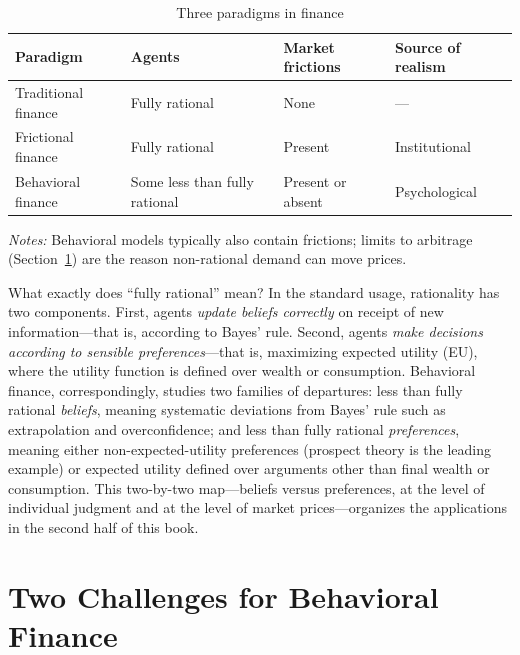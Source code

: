 \begin{table}[htbp]
\centering
\begin{threeparttable}
\caption{Three paradigms in finance}
\label{tab:paradigms}
\begin{tabular}{llll}
\toprule
Paradigm & Agents & Market frictions & Source of realism \\
\midrule
Traditional finance & Fully rational & None & --- \\
Frictional finance & Fully rational & Present & Institutional \\
Behavioral finance & Some less than fully rational & Present or absent & Psychological \\
\bottomrule
\end{tabular}
\begin{tablenotes}[flushleft]\small
\item \textit{Notes:} Behavioral models typically also contain frictions; limits to arbitrage (Section~\ref{sec:challenges}) are the reason non-rational demand can move prices.
\end{tablenotes}
\end{threeparttable}
\end{table}

What exactly does ``fully rational'' mean? In the standard usage, rationality has two components. First, agents \emph{update beliefs correctly} on receipt of new information---that is, according to Bayes' rule. Second, agents \emph{make decisions according to sensible preferences}---that is, maximizing expected utility (EU), where the utility function is defined over wealth or consumption. Behavioral finance, correspondingly, studies two families of departures: less than fully rational \emph{beliefs}, meaning systematic deviations from Bayes' rule such as extrapolation and overconfidence; and less than fully rational \emph{preferences}, meaning either non-expected-utility preferences (prospect theory is the leading example) or expected utility defined over arguments other than final wealth or consumption. This two-by-two map---beliefs versus preferences, at the level of individual judgment and at the level of market prices---organizes the applications in the second half of this book.

\section{Two Challenges for Behavioral Finance}
\label{sec:challenges}

